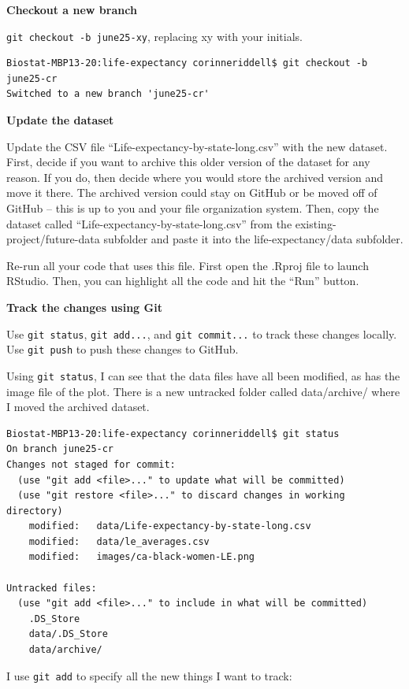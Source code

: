 \documentclass[
]{book}
\begin{document}
\textbf{Checkout a new branch}

\texttt{git\ checkout\ -b\ june25-xy}, replacing xy with your initials.

\begin{verbatim}
Biostat-MBP13-20:life-expectancy corinneriddell$ git checkout -b june25-cr
Switched to a new branch 'june25-cr'
\end{verbatim}

\textbf{Update the dataset}

Update the CSV file ``Life-expectancy-by-state-long.csv'' with the new dataset.
First, decide if you want to archive this older version of the dataset for any reason.
If you do, then decide where you would store the archived version and move it there.
The archived version could stay on GitHub or be moved off of GitHub -- this is
up to you and your file organization system. Then, copy the dataset called
``Life-expectancy-by-state-long.csv'' from the existing-project/future-data
subfolder and paste it into the life-expectancy/data subfolder.

Re-run all your code that uses this file. First open the .Rproj file to launch RStudio. Then, you can highlight all the code and hit the ``Run'' button.

\textbf{Track the changes using Git}

Use \texttt{git\ status}, \texttt{git\ add...}, and \texttt{git\ commit...} to track these changes
locally. Use \texttt{git\ push} to push these changes to GitHub.

Using \texttt{git\ status}, I can see that the data files have all been modified, as has
the image file of the plot. There is a new untracked folder called data/archive/
where I moved the archived dataset.

\begin{verbatim}
Biostat-MBP13-20:life-expectancy corinneriddell$ git status
On branch june25-cr
Changes not staged for commit:
  (use "git add <file>..." to update what will be committed)
  (use "git restore <file>..." to discard changes in working directory)
    modified:   data/Life-expectancy-by-state-long.csv
    modified:   data/le_averages.csv
    modified:   images/ca-black-women-LE.png

Untracked files:
  (use "git add <file>..." to include in what will be committed)
    .DS_Store
    data/.DS_Store
    data/archive/
\end{verbatim}

I use \texttt{git\ add} to specify all the new things I want to track:
\end{document}
